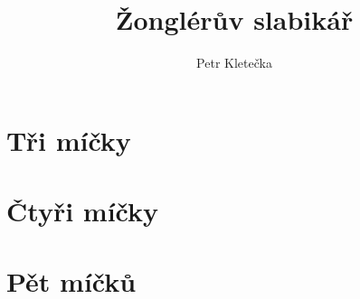 \documentclass[12pt,a4paper,twoside]{book}
\begin{document}
\setlength{\parindent}{0pt}

\title{Žonglérův slabikář}
\author{Petr Kletečka}
\maketitle

\setcounter{tocdepth}{1}
\tableofcontents
{}

\chapter{Tři míčky}



\chapter{Čtyři míčky}



\chapter{Pět míčků}


\end{document}
